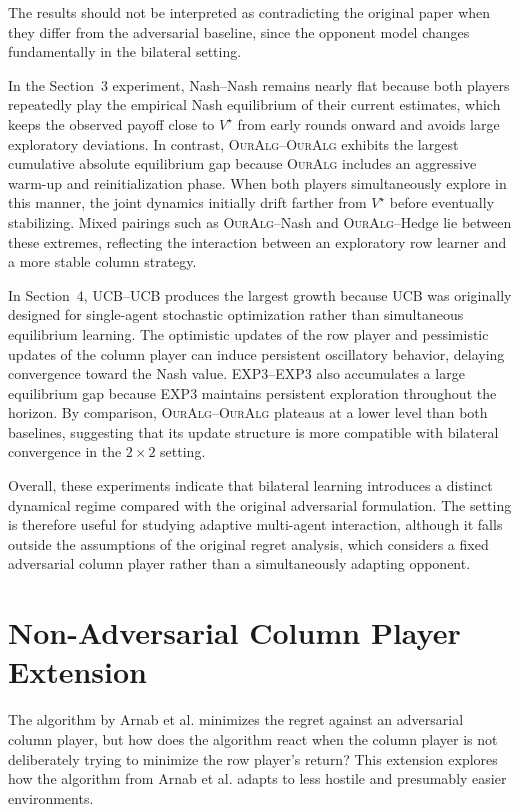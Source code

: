 \documentclass[a4paper,11pt]{article}
\theoremstyle{definition}
\newcommand{\OurAlg}{\textsc{OurAlg}}
\begin{document}
The results should not be interpreted as contradicting the original paper when 
they differ from the adversarial baseline, since the opponent model changes 
fundamentally in the bilateral setting.

In the Section~3 experiment, Nash--Nash remains nearly flat because both players 
repeatedly play the empirical Nash equilibrium of their current estimates, which 
keeps the observed payoff close to $V^\star$ from early rounds onward and avoids 
large exploratory deviations. In contrast, \OurAlg{}--\OurAlg{} exhibits the 
largest cumulative absolute equilibrium gap because \OurAlg{} includes an aggressive 
warm-up and reinitialization phase. When both players simultaneously explore in 
this manner, the joint dynamics initially drift farther from $V^\star$ before 
eventually stabilizing. Mixed pairings such as \OurAlg{}--Nash and 
\OurAlg{}--Hedge lie between these extremes, reflecting the interaction between 
an exploratory row learner and a more stable column strategy.

In Section~4, UCB--UCB produces the largest growth because UCB was originally 
designed for single-agent stochastic optimization rather than simultaneous 
equilibrium learning. The optimistic updates of the row player and pessimistic 
updates of the column player can induce persistent oscillatory behavior, delaying 
convergence toward the Nash value. EXP3--EXP3 also accumulates a large equilibrium 
gap because EXP3 maintains persistent exploration throughout the horizon. 
By comparison, \OurAlg{}--\OurAlg{} plateaus at a lower level than both baselines, 
suggesting that its update structure is more compatible with bilateral convergence 
in the $2 \times 2$ setting.

Overall, these experiments indicate that bilateral learning introduces a distinct 
dynamical regime compared with the original adversarial formulation. The setting 
is therefore useful for studying adaptive multi-agent interaction, although it 
falls outside the assumptions of the original regret analysis, which considers 
a fixed adversarial column player rather than a simultaneously adapting opponent.

\FloatBarrier

\section{Non-Adversarial Column Player Extension}
The algorithm by Arnab et al. minimizes the regret against an adversarial column player, but how does the algorithm react when the column player is not deliberately trying to minimize the row player's return? This extension explores how the algorithm from Arnab et al. adapts to less hostile and presumably easier environments.
\end{document}
